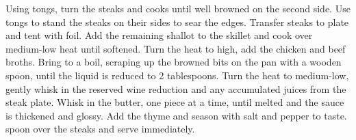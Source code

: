 \documentclass[11pt, letterpaper]{article}
\begin{document}
\begin{recipe}
{      \step Using tongs, turn the steaks and cooks until well browned on the second side.
      \step Use tongs to stand the steaks on their sides to sear the edges.
      \step Transfer steaks to plate and tent with foil.
      \step Add the remaining shallot to the skillet and cook over medium-low heat until
            softened.
      \step Turn the heat to high, add the chicken and beef broths. Bring to a boil,
            scraping up the browned bits on the pan with a wooden spoon, until the liquid
            is reduced to 2 tablespoons.
      \step Turn the heat to medium-low, gently whisk in the reserved wine reduction and
            any accumulated juices from the steak plate.
      \step Whisk in the butter, one piece at a time, until melted and the sauce is
            thickened and glossy.
      \step Add the thyme and season with salt and pepper to taste.
      \step spoon over the steaks and serve immediately.
    }
  \end{recipe}
\end{document}
